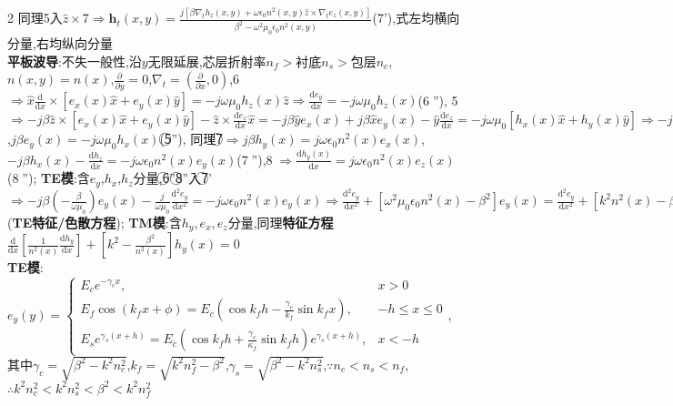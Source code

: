 \documentclass[a4paper,10pt]{article}
\begin{document}
\begin{multicols*}{2}
    同理\textcircled{\tiny{5}}入$\hat{z}\times$\textcircled{\tiny{7}}$\Rightarrow\bm{h}_t(x,y)=\frac{j[\beta\nabla_th_z(x,y)+\omega\epsilon_0n^2(x,y)\hat{z}\times\nabla_te_z(x,y)]}{\beta^2-\omega^2\mu_0\epsilon_0n^2(x,y)}$(\textcircled{\tiny{7'}}),式左均横向分量,右均纵向分量\\
\textbf{平板波导}:不失一般性,沿$y$无限延展,芯层折射率$n_f>$衬底$n_s>$包层$n_c$,$n(x,y)=n(x)$,$\frac{\partial}{\partial y}=0$,$\nabla_t=(\frac{\partial}{\partial x},0)$,\textcircled{6}$\Rightarrow\hat{x}\frac{\mathrm{d}}{\mathrm{d}x}\times[e_x(x)\hat{x}+e_y(x)\hat{y}]=-j\omega\mu_0h_z(x)\hat{z}\Rightarrow\frac{\mathrm{d}e_y}{\mathrm{d}x}=-j\omega\mu_0h_z(x)$(\textcircled{6''}),%
    \textcircled{5}$\Rightarrow-j\beta\hat{z}\times[e_x(x)\hat{x}+e_y(x)\hat{y}]-\hat{z}\times\frac{\mathrm{d}e_z}{\mathrm{d}x}\hat{x}=-j\beta\hat{y}e_x(x)+j\beta\hat{x}e_y(x)-\hat{y}\frac{\mathrm{d}e_z}{\mathrm{d}x}=-j\omega\mu_0[h_x(x)\hat{x}+h_y(x)\hat{y}]\Rightarrow-j\beta e_x(x)-\frac{\mathrm{d}e_z}{\mathrm{d}x}=-j\omega\mu_0h_y(x)$,$j\beta e_y(x)=-j\omega\mu_0h_x(x)$(\textcircled{5''}),%
    同理\textcircled{7}$\Rightarrow j\beta h_y(x)=j\omega\epsilon_0n^2(x)e_x(x)$,$-j\beta h_x(x)-\frac{\mathrm{d}h_z}{\mathrm{d}x}=-j\omega\epsilon_0n^2(x)e_y(x)$(\textcircled{7''}),\textcircled{8}$\Rightarrow\frac{\mathrm{d}h_y(x)}{\mathrm{d}x}=j\omega\epsilon_0n^2(x)e_z(x)$(\textcircled{8''});%
    \textbf{TE模}:含$e_y$,$h_x$,$h_z$分量,\textcircled{6''}\textcircled{8''}入\textcircled{7'}$\Rightarrow-j\beta(-\frac{\beta}{\omega\mu_0})e_y(x)-\frac{j}{\omega\mu_0}\frac{\mathrm{d}^2e_y}{\mathrm{d}x^2}=-j\omega\epsilon_0n^2(x)e_y(x)\Rightarrow\frac{\mathrm{d}^2e_y}{\mathrm{d}x^2}+[\omega^2\mu_0\epsilon_0n^2(x)-\beta^2]e_y(x)=\frac{\mathrm{d}^2e_y}{\mathrm{d}x^2}+[k^2n^2(x)-\beta^2]e_y(x)=0$(\textbf{TE特征/色散方程});%
    \textbf{TM模}:含$h_y,e_x,e_z$分量,同理\textbf{特征方程}$\frac{\mathrm{d}}{\mathrm{d}x}[\frac{1}{n^2(x)}\frac{\mathrm{d}h_y}{\mathrm{d}x}]+[k^2-\frac{\beta^2}{n^2(x)}]h_y(x)=0$\\
\textbf{TE模}:$e_y(y)=\left\{\begin{array}{ll}
    E_ce^{-\gamma_cx},&x>0\\
    E_f\cos(k_fx+\phi)=E_c(\cos k_fh-\frac{\gamma_c}{k_f}\sin k_fx),&-h\leq x\leq 0\\
    E_se^{\gamma_s(x+h)}=E_c(\cos k_fh+\frac{\gamma_c}{\kappa_f}\sin k_fh)e^{\gamma_s(x+h)},&x<-h
\end{array}\right.$,%
    其中$\gamma_c=\sqrt{\beta^2-k^2n_c^2}$,$k_f=\sqrt{k^2n_f^2-\beta^2}$,$\gamma_s=\sqrt{\beta^2-k^2n_s^2}$,$\because n_c<n_s<n_f$,$\therefore k^2n_c^2<k^2n_s^2<\beta^2<k^2n_f^2$\\

\end{multicols*}
\end{document}
